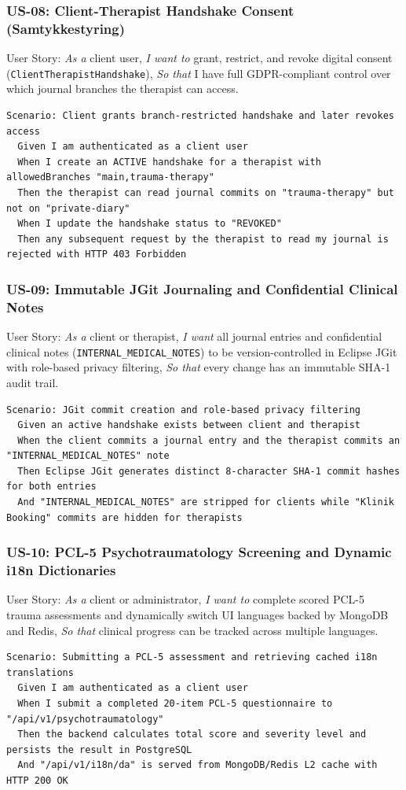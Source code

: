 \documentclass[11pt,a4paper]{article}
\begin{document}
\begin{table}[htbp]
\begin{table}[htbp]
\subsubsection{US-08: Client-Therapist Handshake Consent (Samtykkestyring)}
User Story: \textit{As a} client user, \textit{I want to} grant, restrict, and revoke digital consent (\texttt{ClientTherapist\allowbreak Handshake}), \textit{So that} I have full GDPR-compliant control over which journal branches the therapist can access.
\begin{lstlisting}[language={}]
Scenario: Client grants branch-restricted handshake and later revokes access
  Given I am authenticated as a client user
  When I create an ACTIVE handshake for a therapist with allowedBranches "main,trauma-therapy"
  Then the therapist can read journal commits on "trauma-therapy" but not on "private-diary"
  When I update the handshake status to "REVOKED"
  Then any subsequent request by the therapist to read my journal is rejected with HTTP 403 Forbidden
\end{lstlisting}

\subsubsection{US-09: Immutable JGit Journaling and Confidential Clinical Notes}
User Story: \textit{As a} client or therapist, \textit{I want} all journal entries and confidential clinical notes (\texttt{INTERNAL\_MEDICAL\_NOTES}) to be version-controlled in Eclipse JGit with role-based privacy filtering, \textit{So that} every change has an immutable SHA-1 audit trail.
\begin{lstlisting}[language={}]
Scenario: JGit commit creation and role-based privacy filtering
  Given an active handshake exists between client and therapist
  When the client commits a journal entry and the therapist commits an "INTERNAL_MEDICAL_NOTES" note
  Then Eclipse JGit generates distinct 8-character SHA-1 commit hashes for both entries
  And "INTERNAL_MEDICAL_NOTES" are stripped for clients while "Klinik Booking" commits are hidden for therapists
\end{lstlisting}

\subsubsection{US-10: PCL-5 Psychotraumatology Screening and Dynamic i18n Dictionaries}
User Story: \textit{As a} client or administrator, \textit{I want to} complete scored PCL-5 trauma assessments and dynamically switch UI languages backed by MongoDB and Redis, \textit{So that} clinical progress can be tracked across multiple languages.
\begin{lstlisting}[language={}]
Scenario: Submitting a PCL-5 assessment and retrieving cached i18n translations
  Given I am authenticated as a client user
  When I submit a completed 20-item PCL-5 questionnaire to "/api/v1/psychotraumatology"
  Then the backend calculates total score and severity level and persists the result in PostgreSQL
  And "/api/v1/i18n/da" is served from MongoDB/Redis L2 cache with HTTP 200 OK
\end{lstlisting}


\end{table}
\end{table}
\end{document}
